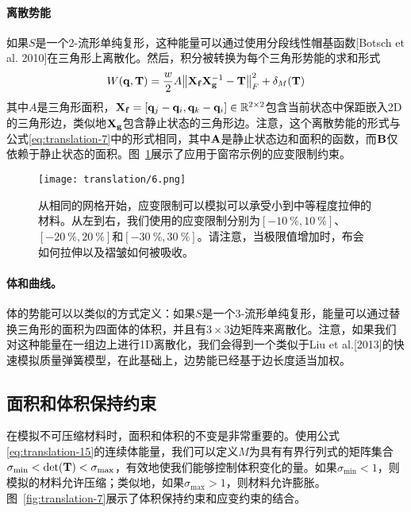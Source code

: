 \begin{translation}
\paragraph{离散势能}

如果$S$是一个2-流形单纯复形，这种能量可以通过使用分段线性帽基函数[Botsch et al. 2010]在三角形上离散化。然后，积分被转换为每个三角形势能的求和形式
\begin{equation}
  W(\vb{q}, \vb{T}) = \frac{w}{2} A \norm{\vb{X}_{\vb{f}} \vb{X}_{\vb{g}}^{-1} - \vb{T}}_F^2 + \delta_M(\vb{T})
  \label{eq:translation-16}
\end{equation}
其中$A$是三角形面积，$\vb{X}_{\vb{f}} = [\vb{q}_j - \vb{q}_i, \vb{q}_k - \vb{q}_i] \in \mathbb{R}^{2 \times 2}$包含当前状态中保距嵌入2D的三角形边，类似地$\vb{X}_{\vb{g}}$包含静止状态的三角形边。注意，这个离散势能的形式与公式\eqref{eq:translation-7}中的形式相同，其中$\vb{A}$是静止状态边和面积的函数，而$\vb{B}$仅依赖于静止状态的面积。图~\ref{fig:translation-6}展示了应用于窗帘示例的应变限制约束。

\begin{figure}
  \centering
  \texttt{[image: translation/6.png]}
  \caption{
    从相同的网格开始，应变限制可以模拟可以承受小到中等程度拉伸的材料。从左到右，我们使用的应变限制分别为$[\SI{-10}{\percent}, \SI{+10}{\percent}]$、$[\SI{-20}{\percent}, \SI{+20}{\percent}]$和$[\SI{-30}{\percent}, \SI{+30}{\percent}]$。请注意，当极限值增加时，布会如何拉伸以及褶皱如何被吸收。
  }
  \label{fig:translation-6}
\end{figure}

\paragraph{体和曲线。}

体的势能可以以类似的方式定义：如果$S$是一个3-流形单纯复形，能量可以通过替换三角形的面积为四面体的体积，并且有$3 \times 3$边矩阵来离散化。注意，如果我们对这种能量在一组边上进行1D离散化，我们会得到一个类似于Liu et al.[2013]的快速模拟质量弹簧模型，在此基础上，边势能已经基于边长度适当加权。

\subsection{面积和体积保持约束}

在模拟不可压缩材料时，面积和体积的不变是非常重要的。使用公式\eqref{eq:translation-15}的连续体能量，我们可以定义$M$为具有有界行列式的矩阵集合$\sigma_{\min} < \det(\vb{T}) < \sigma_{\max}$，有效地使我们能够控制体积变化的量。如果$\sigma_{\min} < 1$，则模拟的材料允许压缩；类似地，如果$\sigma_{\max} > 1$，则材料允许膨胀。图~\ref{fig:translation-7}展示了体积保持约束和应变约束的结合。


\end{translation}
